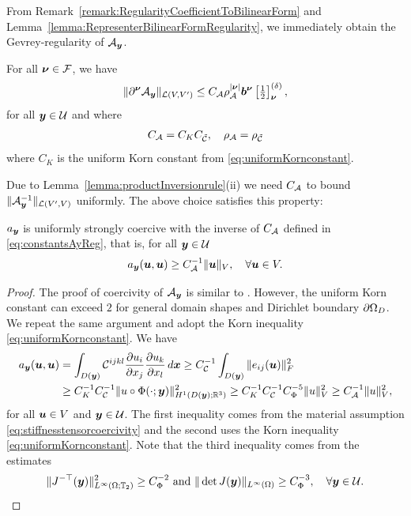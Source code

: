 From Remark~\ref{remark:RegularityCoefficientToBilinearForm} and Lemma~\ref{lemma:RepresenterBilinearFormRegularity}, we immediately obtain the Gevrey-regularity of $\mathcal{A}_{{\boldsymbol{y}}}$.
\begin{lemma}\label{lemma:GevreyRegularityAy}
    For all ${\boldsymbol{\nu}} \in \mathcal{F}$, we have 
    \begin{align*}
        \| \partial^{\boldsymbol{\nu}} \mathcal{A}_{\boldsymbol{y}} \|_{\mathcal{L}(V,V')}  \leq C_{\mathcal{A}} \rho_{\mathcal{A}}^{\vert {\boldsymbol{\nu}} \vert} {\boldsymbol{b}}^{{\boldsymbol{\nu}}} \left[\tfrac{1}{2} \right]^{(\delta)}_{{\boldsymbol{\nu}}},
    \end{align*}
    for all ${\boldsymbol{y}} \in \mathcal{U}$ and where
    \begin{align}\label{eq:constantsAyReg}
        C_{\mathcal{A}} = C_K C_{\tilde {\mathcal{C}}} ,\quad \rho_{\mathcal{A}} = \rho_{\tilde {\mathcal{C}}}
    \end{align}
    where $C_K$ is the uniform Korn constant from \eqref{eq:uniformKornconstant}.
\end{lemma}
Due to Lemma~\ref{lemma:productInversionrule}(ii) we need $C_{\mathcal{A}}$ to bound $\| \mathcal{A}_{{\boldsymbol{y}}}^{-1} \|_{\mathcal{L}(V',V)}$ uniformly. The above choice satisfies this property:
\begin{lemma}\label{lemma:coercivityofay}
     $a_{\boldsymbol{y}}$ is uniformly strongly coercive with the inverse of $C_{\mathcal{A}}$ defined in \eqref{eq:constantsAyReg}, that is, for all ${\boldsymbol{y}} \in \mathcal{U}$
    \begin{align*}
        a_{{\boldsymbol{y}}}({\boldsymbol{u}},{\boldsymbol{u}}) \geq C_{\mathcal{A}}^{-1} \| {\boldsymbol{u}} \|_V, \quad \forall  {\boldsymbol{u}} \in V.
    \end{align*}
\end{lemma}
\begin{proof}
    The proof of coercivity of $\mathcal{A}_{\boldsymbol{y}}$ is similar to \cite[Lemma 2.7]{Harbrecht2023DomainUncertainty}. However, the uniform Korn constant can exceed $2$ for general domain shapes and Dirichlet boundary $\partial \Omega_D$. We repeat the same argument and adopt the Korn inequality \eqref{eq:uniformKornconstant}. We have
\begin{align*}
    a_{{\boldsymbol{y}}}({\boldsymbol{u}},{\boldsymbol{u}}) &= \int_{D({\boldsymbol{y}})} \mathcal{C}^{ijkl} \frac{\partial  u_i}{\partial  x_j} \frac{\partial u_k}{\partial x_l} \mathop{d\boldsymbol{x}} \geq C^{-1}_{\mathcal{C}}  \int_{D({\boldsymbol{y}})}  \|e_{ij}({\boldsymbol{u}})  \|_F^2
    \\
    &\geq C_K^{-1}  C^{-1}_{\mathcal{C}} \| u \circ \Phi(\cdot;{\boldsymbol{y}})\|^2_{H^{1}(D({\boldsymbol{y}});\mathbb{R}^3)} \geq  C_K^{-1}  C^{-1}_{\mathcal{C}} C_{\Phi}^{-5}  \| u \|^2_{V}  \geq C_{\mathcal{A}}^{-1} \| u \|^2_{V},
\end{align*} for all ${\boldsymbol{u}} \in V$ and ${\boldsymbol{y}} \in \mathcal{U}$. The first inequality comes from the material assumption \eqref{eq:stiffnesstensorcoercivity} and the second uses the Korn inequality \eqref{eq:uniformKornconstant}. Note that the third inequality comes from the estimates
\begin{align*}
    \| J^{-\top} ({\boldsymbol{y}}) \|_{L^\infty(\Omega;\mathbb{T}_2)}^2 \geq C^{-2}_{\Phi} \text{ and }  \| \det J({\boldsymbol{y}})\|_{L^\infty(\Omega)} \geq C_\Phi^{-3}, \quad  \forall {\boldsymbol{y}} \in \mathcal{U}.
\end{align*} 
\end{proof}
